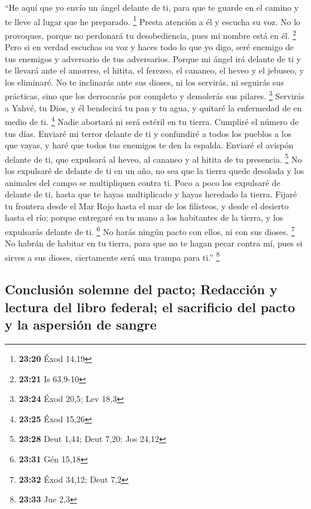  ``He aquí que yo envío un ángel delante de ti, para que
te guarde en el camino y te lleve al lugar que he preparado. \footnote{\textbf{23:20}
  Éxod 14,19}  Presta atención a él y escucha su voz. No
lo provoques, porque no perdonará tu desobediencia, pues mi nombre está
en él. \footnote{\textbf{23:21} Is 63,9-10}  Pero si en
verdad escuchas su voz y haces todo lo que yo digo, seré enemigo de tus
enemigos y adversario de tus adversarios.  Porque mi
ángel irá delante de ti y te llevará ante el amorreo, el hitita, el
ferezeo, el cananeo, el heveo y el jebuseo, y los eliminaré.
 No te inclinarás ante sus dioses, ni los servirás, ni
seguirás sus prácticas, sino que los derrocarás por completo y demolerás
sus pilares. \footnote{\textbf{23:24} Éxod 20,5; Lev 18,3}
 Servirás a Yahvé, tu Dios, y él bendecirá tu pan y tu
agua, y quitaré la enfermedad de en medio de ti. \footnote{\textbf{23:25}
  Éxod 15,26}  Nadie abortará ni será estéril en tu
tierra. Cumpliré el número de tus días.  Enviaré mi
terror delante de ti y confundiré a todos los pueblos a los que vayas, y
haré que todos tus enemigos te den la espalda.  Enviaré
el avispón delante de ti, que expulsará al heveo, al cananeo y al hitita
de tu presencia. \footnote{\textbf{23:28} Deut 1,44; Deut 7,20; Jos
  24,12}  No los expulsaré de delante de ti en un año, no
sea que la tierra quede desolada y los animales del campo se
multipliquen contra ti.  Poco a poco los expulsaré de
delante de ti, hasta que te hayas multiplicado y hayas heredado la
tierra.  Fijaré tu frontera desde el Mar Rojo hasta el
mar de los filisteos, y desde el desierto hasta el río; porque entregaré
en tu mano a los habitantes de la tierra, y los expulsarás delante de
ti. \footnote{\textbf{23:31} Gén 15,18}  No harás ningún
pacto con ellos, ni con sus dioses. \footnote{\textbf{23:32} Éxod 34,12;
  Deut 7,2}  No habrán de habitar en tu tierra, para que
no te hagan pecar contra mí, pues si sirves a sus dioses, ciertamente
será una trampa para ti.'' \footnote{\textbf{23:33} Jue 2,3}

\hypertarget{conclusiuxf3n-solemne-del-pacto-redacciuxf3n-y-lectura-del-libro-federal-el-sacrificio-del-pacto-y-la-aspersiuxf3n-de-sangre}{%
\subsection{Conclusión solemne del pacto; Redacción y lectura del libro
federal; el sacrificio del pacto y la aspersión de
sangre}\label{conclusiuxf3n-solemne-del-pacto-redacciuxf3n-y-lectura-del-libro-federal-el-sacrificio-del-pacto-y-la-aspersiuxf3n-de-sangre}}

